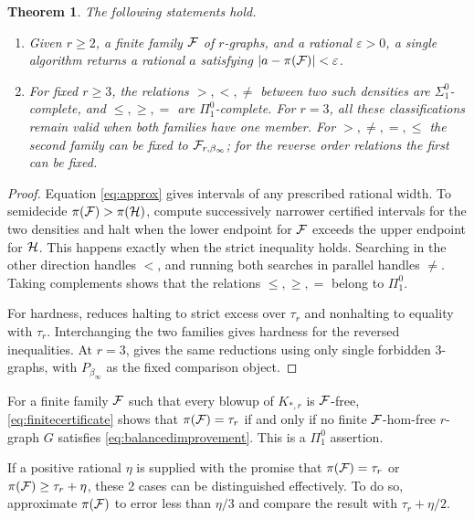 \documentclass[10pt]{article}
\numberwithin{equation}{section}
\newtheorem{theorem}{Theorem}[section]
\theoremstyle{definition}
\newcommand{\eps}{\varepsilon}\newcommand{\dotcup}{\mathbin{\dot\cup}}
\begin{document}
\begin{theorem}\label{thm:finitecomparison}
The following statements hold.
\begin{enumerate}[beginpenalty=10000]
\item Given $r\ge2$, a finite family $\mathcal F$ of $r$-graphs, and a rational $\eps>0$, a single algorithm returns a rational $a$ satisfying $|a-\pi(\cF)|<\eps$.
\item For fixed $r\ge3$, the relations $>,<,\ne$ between two such densities are $\Sigma^0_1$-complete, and $\le,\ge,=$ are $\Pi^0_1$-complete. For $r=3$, all these classifications remain valid when both families have one member. For $>,\ne,=,\le$ the second family can be fixed to $\mathcal F_{r,\beta_\infty}$; for the reverse order relations the first can be fixed.
\end{enumerate}
\end{theorem}
\begin{proof}
Equation \eqref{eq:approx} gives intervals of any prescribed rational width. To semidecide $\pi(\mathcal F)>\pi(\mathcal H)$, compute successively narrower certified intervals for the two densities and halt when the lower endpoint for $\mathcal F$ exceeds the upper endpoint for $\mathcal H$. This happens exactly when the strict inequality holds. Searching in the other direction handles $<$, and running both searches in parallel handles $\ne$. Taking complements shows that the relations $\le,\ge,=$ belong to $\Pi^0_1$.

For hardness,  reduces halting to strict excess over $\tau_r$ and nonhalting to equality with $\tau_r$. Interchanging the two families gives hardness for the reversed inequalities. At $r=3$,  gives the same reductions using only single forbidden $3$-graphs, with $P_{\beta_\infty}$ as the fixed comparison object.
\end{proof}
For a finite family $\mathcal F$ such that every blowup of $K_{*,r}$ is $\mathcal F$-free, \eqref{eq:finitecertificate} shows that $\pi(\mathcal F)=\tau_r$ if and only if no finite $\mathcal F$-hom-free $r$-graph $G$ satisfies \eqref{eq:balancedimprovement}. This is a $\Pi^0_1$ assertion.

If a positive rational $\eta$ is supplied with the promise that $\pi(\mathcal F)=\tau_r$ or $\pi(\mathcal F)\ge\tau_r+\eta$, these 2 cases can be distinguished effectively. To do so, approximate $\pi(\mathcal F)$ to error less than $\eta/3$ and compare the result with $\tau_r+\eta/2$.
\end{document}
